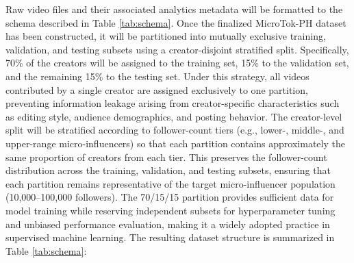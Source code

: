 Raw video files and their associated analytics metadata will be formatted to the schema described in Table \ref{tab:schema}. Once the finalized MicroTok-PH dataset has been constructed, it will be partitioned into mutually exclusive training, validation, and testing subsets using a creator-disjoint stratified split. Specifically, 70\% of the creators will be assigned to the training set, 15\% to the validation set, and the remaining 15\% to the testing set. Under this strategy, all videos contributed by a single creator are assigned exclusively to one partition, preventing information leakage arising from creator-specific characteristics such as editing style, audience demographics, and posting behavior. The creator-level split will be stratified according to follower-count tiers (e.g., lower-, middle-, and upper-range micro-influencers) so that each partition contains approximately the same proportion of creators from each tier. This preserves the follower-count distribution across the training, validation, and testing subsets, ensuring that each partition remains representative of the target micro-influencer population (10,000--100,000 followers). The 70/15/15 partition provides sufficient data for model training while reserving independent subsets for hyperparameter tuning and unbiased performance evaluation, making it a widely adopted practice in supervised machine learning. The resulting dataset structure is summarized in Table \ref{tab:schema}:

